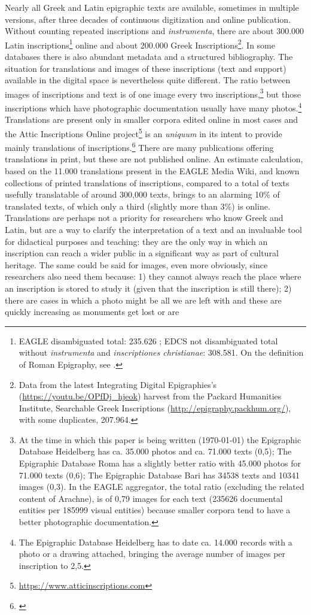 \documentclass[amsthm,ebook]{saparticle}
\begin{document}
\noindent Nearly all Greek and Latin epigraphic texts are available, sometimes in multiple versions, after three decades of continuous digitization and online publication. Without counting repeated inscriptions and \textit{instrumenta}, there are about 300.000 Latin inscriptions\footnote{EAGLE disambiguated total: 235.626 ; EDCS not disambiguated total without \textit{instrumenta} and \textit{inscriptiones christianae}: 308.581. On the definition of Roman Epigraphy, see \citet{Panciera2012}.} online and about 200.000 Greek Inscriptions\footnote{Data from the latest Integrating Digital Epigraphies's (\url{https://youtu.be/OPfDj_hjeok}) harvest from the Packard Humanities Institute, Searchable Greek Inscriptions (\url{http://epigraphy.packhum.org/}), with some duplicates, 207.964.}. In some databases there is also abundant metadata and  a structured bibliography. The situation for translations and images of these inscriptions (text and support) available in the digital space is nevertheless quite different. The ratio between images of inscriptions and text is of one image every two inscriptions,\footnote{At the time in which this paper is being written (\today) the Epigraphic Database Heidelberg has ca. 35.000 photos and ca. 71.000 texts (0,5); The Epigraphic Database Roma has a slightly better ratio with 45.000 photos for 71.000 texts (0,6); The Epigraphic Database Bari has 34538 texts and 10341 images (0,3). In the EAGLE aggregator, the total ratio (excluding the related content of Arachne), is of 0,79 images for each text (235626 documental entities per 185999 visual entities) because smaller corpora tend to have a better photographic documentation.} but those inscriptions which have photographic documentation usually have many photos.\footnote{The Epigraphic Database Heidelberg has to date ca. 14.000 records with a photo or a drawing attached, bringing the average number of images per inscription to 2,5.} Translations are present only in smaller corpora edited online in most cases and the Attic Inscriptions Online project\footnote{\url{https://www.atticinscriptions.com}} is an \textit{uniquum} in its intent to provide mainly translations of inscriptions.\footnote{\citet{Lambert2014}} There are many publications offering translations in print, but these are not published online. An estimate calculation, based on the 11.000 translations present in the EAGLE Media Wiki, and known collections of printed translations of inscriptions, compared to a total of texts usefully translatable of around 300,000 texts, brings to an alarming 10\% of translated texts, of which only a third (slightly more than 3\%) is online. Translations are perhaps not a priority for researchers who know Greek and Latin, but are a way to clarify the interpretation of a text and an invaluable tool for didactical purposes and teaching: they are the only way in which an inscription can reach a wider public in a significant way as part of cultural heritage. The same could be said for images, even more obviously, since researchers also need them because: 1) they cannot always reach the place where an inscription is stored to study it  (given that the inscription is still there); 2) there are cases  in which a photo might be all we are left with and these are quickly increasing as monuments get lost or are 
\end{document}

